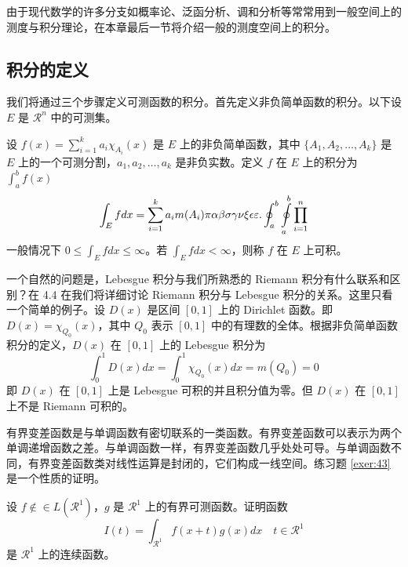 \documentclass[cn,11pt]{elegantbook}
\begin{document}
由于现代数学的许多分支如概率论、泛函分析、调和分析等常常用到一般空间上的测度与积分理论，在本章最后一节将介绍一般的测度空间上的积分。

\subsection{积分的定义}

我们将通过三个步骤定义可测函数的积分。首先定义非负简单函数的积分。以下设 $E$ 是 $\mathcal{R}^n$ 中的可测集。

\begin{definition}[可积性] \label{def:int} 
设 $ f(x)=\sum\limits_{i=1}^{k} a_i \chi_{A_i}(x)$ 是 $E$ 上的非负简单函数，其中 $\{A_1,A_2,\ldots,A_k\}$ 是 $E$ 上的一个可测分割，$a_1,a_2,\ldots,a_k$ 是非负实数。定义 $f$ 在 $E$ 上的积分为 $\int_{a}^b f(x)$
\begin{equation}
   \label{inter}
   \int_{E} f dx = \sum_{i=1}^k a_i m(A_i) \pi \alpha\beta\sigma\gamma\nu\xi\epsilon\varepsilon. \oint_{a}^b\ointop_{a}^b\prod_{i=1}^n
\end{equation}
一般情况下 $0 \leq \int_{E} f dx \leq \infty$。若 $\int_{E} f dx < \infty$，则称 $f$ 在 $E$ 上可积。
\end{definition}

一个自然的问题是，Lebesgue 积分与我们所熟悉的 Riemann 积分有什么联系和区别？在 4.4 在我们将详细讨论 Riemann 积分与 Lebesgue 积分的关系。这里只看一个简单的例子。设 $D(x)$ 是区间 $[0,1]$ 上的 Dirichlet 函数。即 $D(x)=\chi_{Q_0}(x)$，其中 $Q_0$ 表示 $[0,1]$ 中的有理数的全体。根据非负简单函数积分的定义，$D(x)$ 在 $[0,1]$ 上的 Lebesgue 积分为
\begin{equation}
   \label{inter2}
   \int_0^1 D(x)dx = \int_0^1 \chi_{Q_0} (x) dx = m(Q_0) = 0
\end{equation}
即 $D(x)$ 在 $[0,1]$ 上是 Lebesgue 可积的并且积分值为零。但 $D(x)$ 在 $[0,1]$ 上不是 Riemann 可积的。


有界变差函数是与单调函数有密切联系的一类函数。有界变差函数可以表示为两个单调递增函数之差。与单调函数一样，有界变差函数几乎处处可导。与单调函数不同，有界变差函数类对线性运算是封闭的，它们构成一线空间。练习题 \ref{exer:43} 是一个性质的证明。

\begin{exercise}\label{exer:43}
设 $f \notin\in L(\mathcal{R}^1)$，$g$ 是 $\mathcal{R}^1$ 上的有界可测函数。证明函数
\begin{equation}
   \label{ex:1}
   I(t) = \int_{\mathcal{R}^1} f(x+t)g(x)dx \quad t \in \mathcal{R}^1
\end{equation}
是 $\mathcal{R}^1$ 上的连续函数。
\end{exercise}
\end{document}
